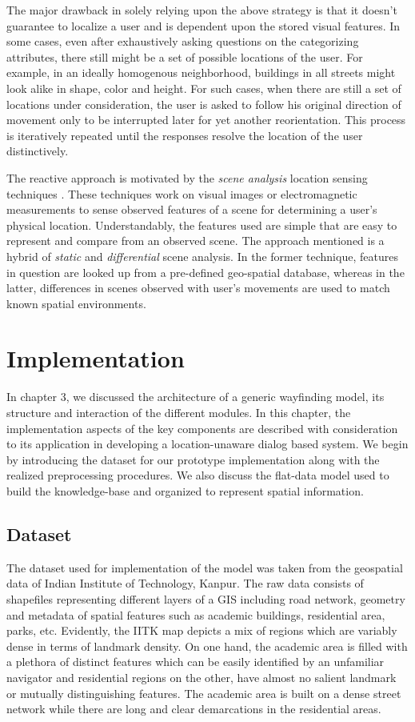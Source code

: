 \documentclass{iitkthesis}
\begin{document}
The major drawback in solely relying upon the above strategy is that it doesn't guarantee to localize a user and is dependent upon the stored visual features. In some cases, even after exhaustively asking questions on the categorizing attributes, there still might be a set of possible locations of the user. For example, in an ideally homogenous neighborhood, buildings in all streets might look alike in shape, color and height. For such cases, when there are still a set of locations under consideration, the user is asked to follow his original direction of movement only to be interrupted later for yet another reorientation. This process is iteratively repeated until the responses resolve the location of the user distinctively.

The reactive approach is motivated by the \textit{scene analysis} location sensing techniques \cite{hightower}. These techniques work on visual images or electromagnetic measurements to sense observed features of a scene for determining a user's physical location. Understandably, the features used are simple that are easy to represent and compare from an observed scene. The approach mentioned is a hybrid of \textit{static} and \textit{differential} scene analysis. In the former technique, features in question are looked up from a pre-defined geo-spatial database, whereas in the latter, differences in scenes observed with user's movements are used to match known spatial environments.

 \chapter{Implementation}
In chapter 3, we discussed the architecture of a generic wayfinding model, its structure and interaction of the different modules. In this chapter, the implementation aspects of the key components are described with consideration to its application in developing a location-unaware dialog based system. We begin by introducing the dataset for our prototype implementation along with the realized preprocessing procedures. We also discuss the flat-data model used to build the knowledge-base and organized to represent spatial information.
 
 \section{Dataset}
The dataset used for implementation of the model was taken from the geospatial data of Indian Institute of Technology, Kanpur. The raw data consists of shapefiles representing different layers of a GIS including road network, geometry and metadata of spatial features such as academic buildings, residential area, parks, etc. Evidently, the IITK map depicts a mix of regions which are variably dense in terms of landmark density. On one hand, the academic area is filled with a plethora of distinct features which can be easily identified by an unfamiliar navigator and residential regions on the other, have almost no salient landmark or mutually distinguishing features. The academic area is built on a dense street network while there are long and clear demarcations in the residential areas.
\end{document}
